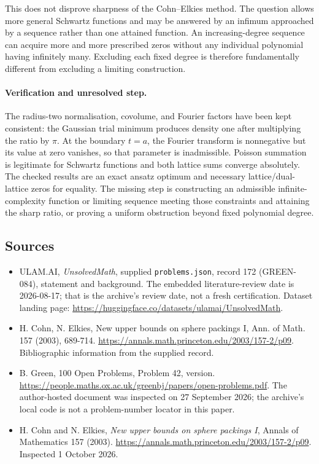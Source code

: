 \documentclass[11pt,a4paper]{article}
\begin{document}
This does not disprove sharpness of the Cohn--Elkies method. The question allows more general Schwartz functions and may be answered by an infimum approached by a sequence rather than one attained function. An increasing-degree sequence can acquire more and more prescribed zeros without any individual polynomial having infinitely many. Excluding each fixed degree is therefore fundamentally different from excluding a limiting construction.

\paragraph{Verification and unresolved step.}
The radius-two normalisation, covolume, and Fourier factors have been kept consistent: the Gaussian trial minimum produces density one after multiplying the ratio by $\pi$. At the boundary $t=a$, the Fourier transform is nonnegative but its value at zero vanishes, so that parameter is inadmissible. Poisson summation is legitimate for Schwartz functions and both lattice sums converge absolutely. The checked results are an exact ansatz optimum and necessary lattice/dual-lattice zeros for equality. The missing step is constructing an admissible infinite-complexity function or limiting sequence meeting those constraints and attaining the sharp ratio, or proving a uniform obstruction beyond fixed polynomial degree.

\subsection{Sources}

{\small

\begin{itemize}

\item[\hypertarget{source:172:1}{S1}] ULAM.AI, \emph{UnsolvedMath}, supplied \texttt{problems.json}, record 172 (GREEN-084), statement and background. The embedded literature-review date is 2026-08-17; that is the archive’s review date, not a fresh certification. Dataset landing page: \url{https://huggingface.co/datasets/ulamai/UnsolvedMath}.

\item[\hypertarget{source:172:2}{S2}] H. Cohn, N. Elkies, New upper bounds on sphere packings I, Ann. of Math. 157 (2003), 689-714. \url{https://annals.math.princeton.edu/2003/157-2/p09}. Bibliographic information from the supplied record.

\item[\hypertarget{source:172:3}{S3}] B. Green, 100 Open Problems, Problem 42, version. \url{https://people.maths.ox.ac.uk/greenbj/papers/open-problems.pdf}. The author-hosted document was inspected on 27 September 2026; the archive’s local code is not a problem-number locator in this paper.

\item[E1] H. Cohn and N. Elkies, \emph{New upper bounds on sphere packings I}, Annals of Mathematics 157 (2003). \url{https://annals.math.princeton.edu/2003/157-2/p09}. Inspected 1 October 2026.

\end{itemize}

}

\label{end:172}
\end{document}
